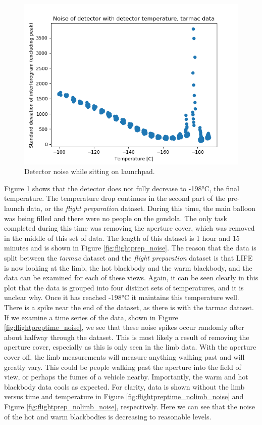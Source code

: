 \begin{figure}[ht]
  \includegraphics[width=\linewidth]{mct_noise_temp_plots/tarmac_noisevstemp_invertedx.png}
  \caption{Detector noise while sitting on launchpad.}
  \label{fig:tarmac_noise}
\end{figure}

Figure \ref{fig:tarmac_noise} shows that the detector does not fully decrease to -198°C, the final temperature. The temperature drop continues in the second part of the pre-launch data, or the \textit{flight preparation} dataset. During this time, the main balloon was being filled and there were no people on the gondola. The only task completed during this time was removing the aperture cover, which was removed in the middle of this set of data. The length of this dataset is 1 hour and 15 minutes and is shown in Figure \ref{fig:flightprep_noise}. The reason that the data is split between the \textit{tarmac} dataset and the \textit{flight preparation} dataset is that LIFE is now looking at the limb, the hot blackbody and the warm blackbody, and the data can be examined for each of these views. Again, it can be seen clearly in this plot that the data is grouped into four distinct sets of temperatures, and it is unclear why. Once it has reached -198°C it maintains this temperature well. There is a spike near the end of the dataset, as there is with the tarmac dataset. If we examine a time series of the data, shown in Figure \ref{fig:flightpreptime_noise}, we see that these noise spikes occur randomly after about halfway through the dataset. This is most likely a result of removing the aperture cover, especially as this is only seen in the limb data. With the aperture cover off, the limb measurements will measure anything walking past and will greatly vary. This could be people walking past the aperture into the field of view, or perhaps the fumes of a vehicle nearby. Importantly, the warm and hot blackbody data cools as expected. For clarity, data is shown without the limb versus time and temperature in Figure \ref{fig:flightpreptime_nolimb_noise} and Figure \ref{fig:flightprep_nolimb_noise}, respectively. Here we can see that the noise of the hot and warm blackbodies is decreasing to reasonable levels.

